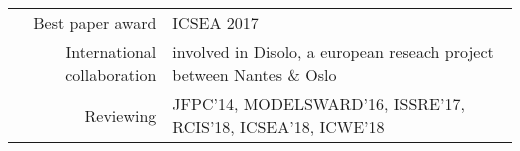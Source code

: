 
\begin{tabular}{r @{~$\rangle$~} p{}}

Best paper award & ICSEA 2017\\

International collaboration & involved in Disolo, a european reseach project between Nantes \& Oslo \\

Reviewing & JFPC'14, MODELSWARD'16, ISSRE'17, RCIS'18, ICSEA'18, ICWE'18 \\

\end{tabular}
